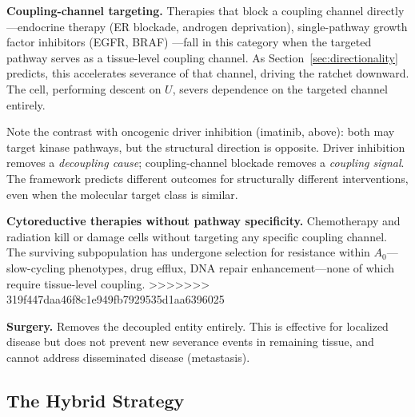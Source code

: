 \documentclass[11pt]{article}
\theoremstyle{definition}
\theoremstyle{remark}
\begin{document}
\textbf{Coupling-channel targeting.} Therapies that block a coupling
channel directly---endocrine therapy (ER blockade, androgen
deprivation), single-pathway growth factor inhibitors (EGFR, BRAF)
---fall in this category when the targeted pathway serves as a
tissue-level coupling channel. As Section~\ref{sec:directionality}
predicts, this accelerates severance of that channel, driving
the ratchet downward. The cell, performing descent on $U$, severs
dependence on the targeted channel entirely.

Note the contrast with oncogenic driver inhibition (imatinib, above):
both may target kinase pathways, but the structural direction is
opposite. Driver inhibition removes a \emph{decoupling cause};
coupling-channel blockade removes a \emph{coupling signal}. The
framework predicts different outcomes for structurally different
interventions, even when the molecular target class is similar.

\textbf{Cytoreductive therapies without pathway specificity.}
Chemotherapy and radiation kill or damage cells without targeting
any specific coupling channel. The surviving subpopulation has
undergone selection for resistance within $A_0$---slow-cycling
phenotypes, drug efflux, DNA repair enhancement---none of which
require tissue-level coupling.
>>>>>>> 319f447daa46f8c1e949fb7929535d1aa6396025

\textbf{Surgery.} Removes the decoupled entity entirely. This is
effective for localized disease but does not prevent new severance
events in remaining tissue, and cannot address disseminated disease
(metastasis).

\subsection{The Hybrid Strategy}
\end{document}
